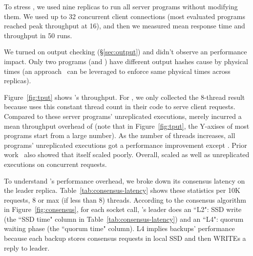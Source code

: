 To stress \xxx, we used nine replicas to run all \nprog server 
programs without modifying them. We used up to 32 concurrent 
client connections (most evaluated programs reached peak throughput at 
16), and then we measured mean response time and throughput in 50 runs.



We turned on output checking (\S\ref{sec:output}) and didn't 
observe an performance impact. Only two programs (\mysql and \openldap) 
have different output hashes cause by physical times 
(an approach~\cite{paxos:practical} can be leveraged to enforce same physical 
times across replicas).

Figure~\ref{fig:tput} shows \xxx's throughput. For \calvin, we only collected 
the 8-thread result because \calvin uses this constant thread count in their 
code to serve client requests. Compared to these server programs' 
unreplicated executions, \xxx merely incurred a mean throughput overhead of 
\tputoverhead (note that in Figure~\ref{fig:tput}, the Y-axises of most 
programs start from a large number). As the number of threads increases, all 
programs' unreplicated executions got a performance improvement except 
\memcached. Prior work~\cite{rex:eurosys14} also showed that
\memcached itself scaled poorly. Overall, \xxx scaled as well as unreplicated 
executions on concurrent requests.


To understand \xxx's performance overhead, we broke down its consensus latency 
on the leader replica. Table~\ref{tab:consensus-latency} shows these statistics 
per 10K requests, 8 or max (if less than 8) threads. According to the consensus 
algorithm in Figure~\ref{fig:consensus}, for each socket call, \xxx's leader 
does an ``L2": SSD write (the ``SSD time" column in 
Table~\ref{tab:consensus-latency}) and an ``L4": quorum waiting phase (the 
``quorum time" column). L4 implies backups' performance because each backup 
stores consensus requests in local SSD and then WRITEs a reply to leader.

